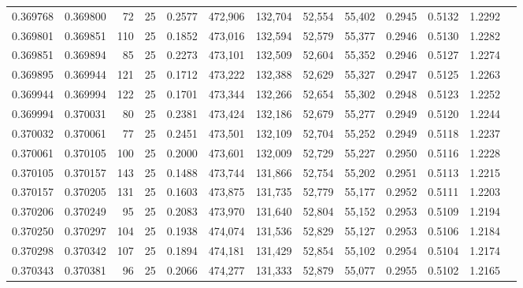 \begin{tabular}{rrrrrrrrrrrrr}
0.369768 & 0.369800 &    72 &  25 &                                     0.2577 & 472,906 & 132,704 &  52,554 &  55,402 & 0.2945 & 0.5132 & 1.2292 \\
0.369801 & 0.369851 &   110 &  25 &                                     0.1852 & 473,016 & 132,594 &  52,579 &  55,377 & 0.2946 & 0.5130 & 1.2282 \\
0.369851 & 0.369894 &    85 &  25 &                                     0.2273 & 473,101 & 132,509 &  52,604 &  55,352 & 0.2946 & 0.5127 & 1.2274 \\
0.369895 & 0.369944 &   121 &  25 &                                     0.1712 & 473,222 & 132,388 &  52,629 &  55,327 & 0.2947 & 0.5125 & 1.2263 \\
0.369944 & 0.369994 &   122 &  25 &                                     0.1701 & 473,344 & 132,266 &  52,654 &  55,302 & 0.2948 & 0.5123 & 1.2252 \\
0.369994 & 0.370031 &    80 &  25 &                                     0.2381 & 473,424 & 132,186 &  52,679 &  55,277 & 0.2949 & 0.5120 & 1.2244 \\
0.370032 & 0.370061 &    77 &  25 &                                     0.2451 & 473,501 & 132,109 &  52,704 &  55,252 & 0.2949 & 0.5118 & 1.2237 \\
0.370061 & 0.370105 &   100 &  25 &                                     0.2000 & 473,601 & 132,009 &  52,729 &  55,227 & 0.2950 & 0.5116 & 1.2228 \\
0.370105 & 0.370157 &   143 &  25 &                                     0.1488 & 473,744 & 131,866 &  52,754 &  55,202 & 0.2951 & 0.5113 & 1.2215 \\
0.370157 & 0.370205 &   131 &  25 &                                     0.1603 & 473,875 & 131,735 &  52,779 &  55,177 & 0.2952 & 0.5111 & 1.2203 \\
0.370206 & 0.370249 &    95 &  25 &                                     0.2083 & 473,970 & 131,640 &  52,804 &  55,152 & 0.2953 & 0.5109 & 1.2194 \\
0.370250 & 0.370297 &   104 &  25 &                                     0.1938 & 474,074 & 131,536 &  52,829 &  55,127 & 0.2953 & 0.5106 & 1.2184 \\
0.370298 & 0.370342 &   107 &  25 &                                     0.1894 & 474,181 & 131,429 &  52,854 &  55,102 & 0.2954 & 0.5104 & 1.2174 \\
0.370343 & 0.370381 &    96 &  25 &                                     0.2066 & 474,277 & 131,333 &  52,879 &  55,077 & 0.2955 & 0.5102 & 1.2165 \\

\end{tabular}
